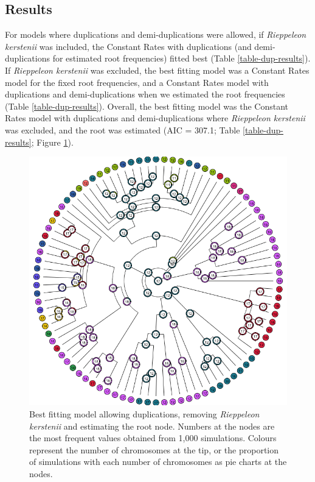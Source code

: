 \documentclass[a4paper, 12pt]{article}
\begin{document}


\subsection{Results}

For models where duplications and demi-duplications were allowed, if \textit{Rieppeleon kerstenii} was included, the Constant Rates with duplications (and demi-duplications for estimated root frequencies) fitted best (Table \ref{table-dup-results}). If \textit{Rieppeleon kerstenii} was excluded, the best fitting model was a Constant Rates model for the fixed root frequencies, and a Constant Rates model with duplications and demi-duplications when we estimated the root frequencies (Table \ref{table-dup-results}). Overall, the best fitting model was the Constant Rates model with duplications and demi-duplications where \textit{Rieppeleon kerstenii} was excluded, and the root was estimated (AIC = 307.1; Table \ref{table-dup-results}; Figure \ref{fig-dup}).



\newpage
\begin{figure}[H]
 \centering
  \includegraphics[width = \linewidth]{figures/figure-chromEvol_best-model-all.png}
  \caption{Best fitting model allowing duplications, removing \textit{Rieppeleon kerstenii} and estimating the root node. Numbers at the nodes are the most frequent values obtained from 1,000 simulations. Colours represent the number of chromosomes at the tip, or the proportion of simulations with each number of chromosomes as pie charts at the nodes.
}
  \label{fig-dup}
\end{figure} 
\end{document}
